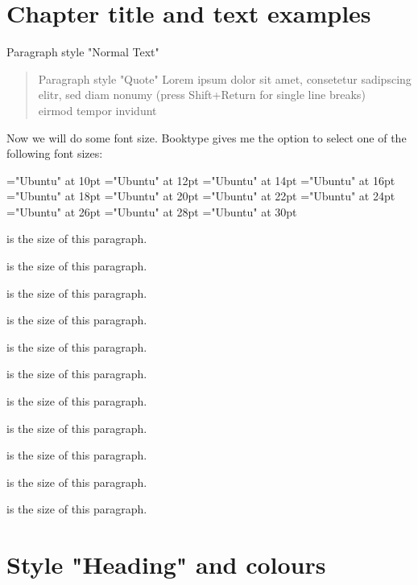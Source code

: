 \chapter{Chapter title and text examples}
Paragraph style "Normal Text"\lipsum[2]

\begin{quote}
Paragraph style "Quote" Lorem ipsum dolor sit
amet, consetetur sadipscing elitr, sed diam nonumy (press
Shift+Return for single line breaks)\\
eirmod tempor invidunt
\end{quote}

Now we will do some font size. Booktype gives me the
option to select one of the following font sizes:

\font\FontSizeTenPT="Ubuntu" at 10pt
\font\FontSizeTwelvePT="Ubuntu" at 12pt
\font\FontSizeFourteenPT="Ubuntu" at 14pt
\font\FontSizeSixteenPT="Ubuntu" at 16pt
\font\FontSizeEighteenPT="Ubuntu" at 18pt
\font\FontSizeTwentyPT="Ubuntu" at 20pt
\font\FontSizeTwentytwoPT="Ubuntu" at 22pt
\font\FontSizeTwentyfourPT="Ubuntu" at 24pt
\font\FontSizeTwentysixPT="Ubuntu" at 26pt
\font\FontSizeTwentyeightPT="Ubuntu" at 28pt
\font\FontSizeThirtyPT="Ubuntu" at 30pt

{\FontSizeTenPT 10pt is the size of this paragraph.}

{\FontSizeTwelvePT 12pt is the size of this paragraph.}

{\FontSizeFourteenPT 14pt is the size of this paragraph.}

{\FontSizeSixteenPT 16pt is the size of this paragraph.}

{\FontSizeEighteenPT 18pt is the size of this paragraph.}

{\FontSizeTwentyPT 20pt is the size of this paragraph.}

{\FontSizeTwentytwoPT 22pt is the size of this paragraph.}

{\FontSizeTwentyfourPT 24pt is the size of this paragraph.}

{\FontSizeTwentysixPT 26pt is the size of this paragraph.}

{\FontSizeTwentyeightPT 28pt is the size of this paragraph.}

{\FontSizeThirtyPT 30pt is the size of this paragraph.}

\chapter{Style "Heading" and colours}

